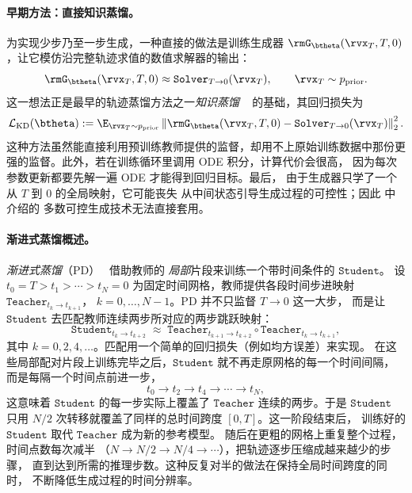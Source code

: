 \paragraph{早期方法：直接知识蒸馏。}
为实现少步乃至一步生成，一种直接的做法是训练生成器
$\rmG_\btheta(\rvx_T, T,0)$，让它模仿沿完整轨迹求值的数值求解器的输出：
\[
\rmG_\btheta(\rvx_T, T,0)\approx \mathtt{Solver}_{T\to 0}(\rvx_T),
\qquad \rvx_T \sim p_{\mathrm{prior}}.
\]
这一想法正是最早的轨迹蒸馏方法之一\emph{知识蒸馏}
~\citep{luhman2021knowledge} 的基础，其回归损失为
\[
\mathcal{L}_{\mathrm{KD}}(\btheta)
:=
\E_{\rvx_T \sim p_{\mathrm{prior}}}
\left\|
\rmG_\btheta(\rvx_T, T,0)
-
\mathtt{Solver}_{T\to 0}(\rvx_T)
\right\|_2^2.
\]
这种方法虽然能直接利用预训练教师提供的监督，却用不上原始训练数据中那份更强的监督。此外，若在训练循环里调用 ODE 积分，计算代价会很高，
因为每次参数更新都要先解一遍 ODE 才能得到回归目标。最后，
由于生成器只学了一个从 $T$ 到 $0$ 的全局映射，它可能丧失
从中间状态引导生成过程的可控性；因此  中介绍的
多数可控生成技术无法直接套用。


\paragraph{渐进式蒸馏概述。}
\emph{渐进式蒸馏}（PD）~\citep{salimans2021progressive} 借助教师的
\emph{局部}片段来训练一个带时间条件的 $\mathtt{Student}$。
设 $t_0=T>t_1>\cdots>t_N=0$ 为固定时间网格，教师提供各段时间步进映射 $\mathtt{Teacher}_{t_k\to t_{k+1}}$，
$k=0,\ldots,N-1$。PD 并不只监督 $T\to 0$ 这一大步，
而是让 $\mathtt{Student}$ 去匹配教师连续两步所对应的两步跳跃映射：
\[
\mathtt{Student}_{t_k\to t_{k+2}}
\;\approx\;
\mathtt{Teacher}_{t_{k+1}\to t_{k+2}}
\circ
\mathtt{Teacher}_{t_{k}\to t_{k+1}},
\]
其中 $k = 0, 2, 4, \dots$。匹配用一个简单的回归损失（例如均方误差）来实现。
在这些局部配对片段上训练完毕之后，$\mathtt{Student}$ 就不再走原网格的每一个时间间隔，而是每隔一个时间点前进一步，
\[
t_0 \to t_2 \to t_4 \to \cdots \to t_N,
\]
这意味着 $\mathtt{Student}$ 的每一步实际上覆盖了
$\mathtt{Teacher}$ 连续的两步。于是 $\mathtt{Student}$ 只用
$N/2$ 次转移就覆盖了同样的总时间跨度 $[0,T]$。这一阶段结束后，
训练好的 $\mathtt{Student}$ 取代 $\mathtt{Teacher}$ 成为新的参考模型。
随后在更粗的网格上重复整个过程，时间点数每次减半
（$N \to N/2 \to N/4 \to \cdots$），把轨迹逐步压缩成越来越少的步骤，
直到达到所需的推理步数。这种反复对半的做法在保持全局时间跨度的同时，
不断降低生成过程的时间分辨率。


